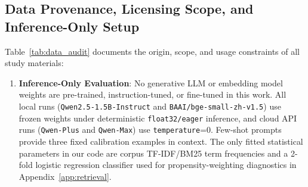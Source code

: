 \documentclass[10pt,twocolumn]{article}
\renewcommand{\_}{\textunderscore\allowbreak}
\begin{document}
\subsection{Data Provenance, Licensing Scope, and Inference-Only Setup}\label{sec:provenance}
Table~\ref{tab:data_audit} documents the origin, scope, and usage constraints of all study materials:
\begin{enumerate}[leftmargin=*,nosep]
  \item \textbf{Inference-Only Evaluation}: No generative LLM or embedding model weights are pre-trained, instruction-tuned, or fine-tuned in this work. All local runs (\texttt{Qwen2.5-1.5B-Instruct} and \texttt{BAAI/bge-small-zh-v1.5}) use frozen weights under deterministic \texttt{float32/eager} inference, and cloud API runs (\texttt{Qwen-Plus} and \texttt{Qwen-Max}) use \texttt{temperature}=0. Few-shot prompts provide three fixed calibration examples in context. The only fitted statistical parameters in our code are corpus TF-IDF/BM25 term frequencies and a 2-fold logistic regression classifier used for propensity-weighting diagnostics in Appendix~\ref{app:retrieval}.

\end{enumerate}
\end{document}
